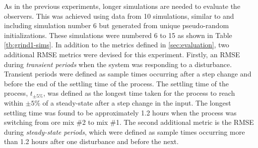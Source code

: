 As in the previous experiments, longer simulations are needed to evaluate the observers. This was achieved using data from 10 simulations, similar to and including simulation number 6 but generated from unique pseudo-random initializations. These simulations were numbered 6 to 15 as shown in Table \ref{tb:grind1-sims}. In addition to the metrics defined in \ref{sec:evaluation}, two additional \gls{RMSE} metrics were devised for this experiment. Firstly, an \gls{RMSE} during \textit{transient periods} when the system was responding to a disturbance. Transient periods were defined as sample times occurring after a step change and before the end of the settling time of the process. The settling time of the process, $t_{\pm5\%}$, was defined as the longest time taken for the process to reach within $\pm5\%$ of a steady-state after a step change in the input. The longest settling time was found to be approximately 1.2 hours when the process was switching from ore mix \#2 to mix \#1. The second additional metric is the \gls{RMSE} during \textit{steady-state periods}, which were defined as sample times occurring more than 1.2 hours after one disturbance and before the next. 
%
